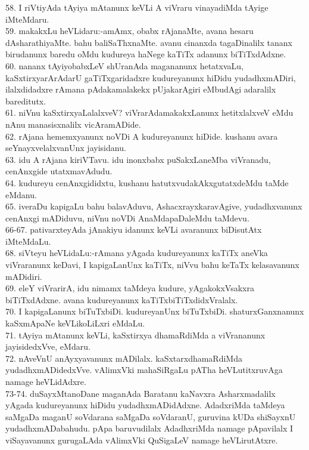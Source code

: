 \documentclass{article}
\begin{document}
58. I riVtiyAda tAyiya mAtanunx keVLi A viVraru vinayadiMda tAyige iMteMdaru.\\
59. makakxLu heVLidaru:-amAmx, obabx rAjanaMte, avana hesaru dAsharathiyaMte. bahu baliSaThxnaMte. avanu cinanxda tagaDinalilx tananx birudanunx baredu oMdu kudureya haNege kaTiTx adanunx  biTiTxdAdxne.\\
60. nananx tAyiyobabxLeV shUranAda magananunx hetatxvaLu, kaSxtirxyarArAdarU gaTiTxgaridadxre kudureyanunx hiDidu yudadhxmADiri, ilalxdidadxre rAmana pAdakamalakekx pUjakarAgiri eMbudAgi adaralilx bareditutx.\\
61. niVnu kaSxtirxyaLalalxveV? viVrarAdamakakxLanunx hetitxlalxveV eMdu nAnu manasisxnalilx vicAramADide.\\
62. rAjana hememxyanunx noVDi A kudureyanunx hiDide. kushanu avara seYnayxvelalxvanUnx jayisidanu.\\
63. idu A rAjana kiriVTavu. idu inonxbabx puSakxLaneMba viVranadu, cenAnxgide utatxmavAdudu.\\
64. kudureyu cenAnxgididxtu, kushanu hatutxvudakAkxgutatxdeMdu taMde eMdanu.\\
65. iveraDu kapigaLu bahu balavAduvu, AshacxrayxkaravAgive, yudadhxvanunx cenAnxgi mADiduvu, niVnu noVDi AnaMdapaDaleMdu taMdevu.\\
66-67. pativarxteyAda jAnakiyu idanunx keVLi avaranunx biDisutAtx iMteMdaLu.\\
68. siVteyu heVLidaLu:-rAmana yAgada kudureyanunx kaTiTx aneVka viVraranunx keDavi, I kapigaLanUnx kaTiTx, niVvu bahu keTaTx kelasavanunx mADidiri.\\
69. eleY viVrarirA, idu nimamx taMdeya kudure, yAgakokxVsakxra biTiTxdAdxne. avana kudureyanunx kaTiTxbiTiTxdidxVralalx.\\
70. I kapigaLanunx biTuTxbiDi. kudureyanUnx biTuTxbiDi. shaturxGanxnanunx kaSxmApaNe keVLikoLiLxri eMdaLu.\\
71. tAyiya mAtanunx keVLi, kaSxtirxya dhamaRdiMda a viVrananunx jayisidedxVve, eMdaru.\\
72. nAveVnU anAyxyavanunx mADilalx. kaSxtarxdhamaRdiMda yudadhxmADidedxVve. vAlimxVki mahaSiRgaLu pATha heVLutitxruvAga namage heVLidAdxre.\\
73-74. duSayxMtanoDane maganAda Baratanu kaNavxra Asharxmadalilx yAgada kudureyanunx hiDidu yudadhxmADidAdxne. AdadxriMda taMdeya saMgaDa maganU soVdarana saMgaDa soVdaranU, guruvina kUDa shiSayxnU yudadhxmADabahudu. pApa baruvudilalx AdadhxriMda namage pApavilalx I viSayavanunx gurugaLAda vAlimxVki QuSigaLeV namage heVLirutAtxre.\\
\end{document}
